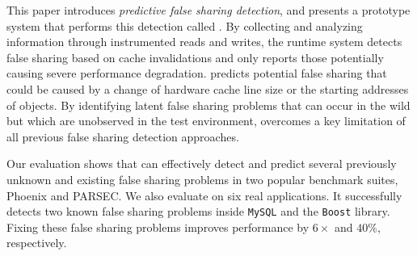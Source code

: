 \label{sec:conclusion}
This paper introduces \emph{predictive false sharing detection}, and presents a prototype system that performs this detection called \Predator{}. By collecting and analyzing information through instrumented reads and writes, the runtime system detects false sharing based on cache invalidations and only reports those potentially causing severe performance degradation.
\Predator{} predicts potential false sharing that could be caused by a change of hardware cache line size or the starting addresses of objects. By identifying latent false sharing problems that can occur in the wild but which are unobserved in the test environment, \Predator{} overcomes a key limitation of
all previous false sharing detection approaches.

Our evaluation shows that \Predator{} can effectively detect and predict several previously unknown and existing false sharing problems in two popular benchmark suites, Phoenix and PARSEC. We also evaluate \Predator{} on six real applications. 
It successfully detects two known false sharing problems inside \texttt{MySQL} and the \texttt{Boost} library.
Fixing these false sharing problems improves performance by $6\times$ and $40\%$, respectively.

